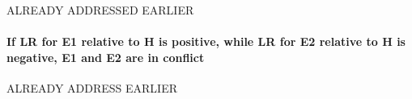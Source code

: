 \documentclass[10pt]{article}
\begin{document}
ALREADY ADDRESSED EARLIER

\paragraph{If LR for E1 relative to H is positive, while LR for E2 relative to H is negative, E1 and E2 are in conflict}

ALREADY ADDRESS EARLIER


\begin{comment}
Consider an example. At trial, there are two conflicting eyewitness testimonies W1 and W2. One witness asserts that the defendant was around the scene of the crime when the crime was committed, abbreviated SC. The other witness offers an alibi for the defendant and asserts that she was with the defendant 
during the time of the crime, abbreviated $\neg SC$.  Suppose SC has a probability of 0.5, regardless of the testimonies W1 or W2.
Suppose, also, that W1 brings the probability of SC to 0.9, whereas W2 brings the probability of H to 0.1 (and thus brings the probability of $\neg SC$ to 0.9). Each testimony has the \textit{same  yet divergent impact} on the probability $P(SC)$. Testimony $W1$ raises the probability of $SC$ while testimony W1 lowers the probability SC. 
They each do so to the same extent but in opposite directions. 
Absent any further information about the trustworthiness of W1 and W2, the two testimonies should cancel one another. 
The evidential strength of each testimony W1 and W2  can be represented, in terms of likelihood ratios, 
as follows:
%
\[LR1=\frac{P(W1| SC)}{P(W1|\neg SC)}=\frac{0.9}{0.1}=9 \text{ and } LR2=\frac{P(W2|SC)}{P(W2|\neg SC)}=\frac{0.1}{0.9}=\frac{1}{9}.\]
%
The combined evidential strength of the two testimonies, $LR1\times LR2=9\times \frac{1}{9}=1$.
When combined, two two testimonies have no impact whatsoever on the probability of SC.
As expected, absent any other information about W1 and W2, the two testimonies 
cancel one another. Their combined evidential strength is therefore null. What should the posterior 
probability $P(SC| W1, W2)$ be? If the combined evidential strength of W1 and W2, is null, then 
$P(SC| W1, W2)=P(SC)$. In our case, $P(SC| W1, W2)=P(SC)=0.5$,  because the value originally assigned to $P(SC)$, 
regardless of the testimonies, was 0.5.



\paragraph{If LR for E1 and E2 relative to H are both positive, E1 and E2 are in agreement}

By contrast, two pieces of evidence E1 and E2 are \textit{convergent}, relative to a hypothesis H, whenever they each impact 
upwards the probability $P(H)$, or in other words, whenever their likelihood ratios relative to H are 
both positive, as follows:
%
\[\textsc{Convergence: } LR1=\frac{P(E1| H)}{P(E1|\neg H)}>1 \text{ and } LR2=\frac{P(E2|H)}{P(E2|\neg H)}>1.\]
%

\end{comment}
\end{document}
